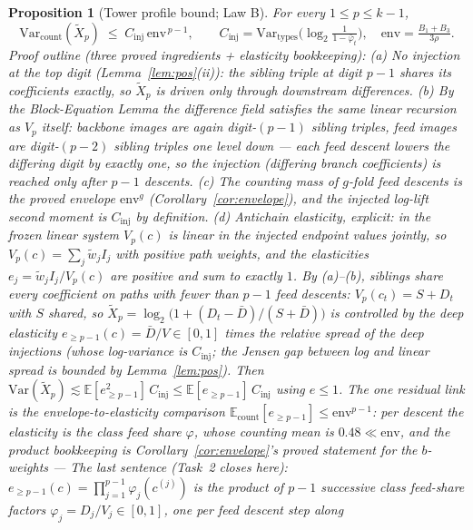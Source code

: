 \documentclass[11pt]{article}
\newtheorem{proposition}[theorem]{Proposition}
\theoremstyle{definition}
\newcommand{\E}{\mathbb{E}}
\newcommand{\Var}{\mathrm{Var}}
\newcommand{\pbar}{\bar\varphi}
\begin{document}
\begin{proposition}[Tower profile bound; Law B]\label{prop:towerB}
For every $1 \le p \le k-1$,
\[
\Var_{\mathrm{count}}(\tilde X_p) \;\le\; C_{\mathrm{inj}}\,
\mathrm{env}^{\,p-1},
\qquad
C_{\mathrm{inj}} = \Var_{\text{types}}\Big(\log_2 \tfrac1{1-\pbar_t}\Big),
\quad \mathrm{env} = \tfrac{B_1+B_3}{3\rho}.
\]
\emph{Proof outline (three proved ingredients + elasticity bookkeeping):}
(a) \emph{No injection at the top digit} (Lemma~\ref{lem:pos}(ii)): the
sibling triple at digit $p{-}1$ shares its coefficients exactly, so
$\tilde X_p$ is driven only through downstream differences. (b) By the
Block-Equation Lemma the difference field satisfies the \emph{same} linear
recursion as $V_p$ itself: backbone images are again digit-$(p{-}1)$
sibling triples, feed images are digit-$(p{-}2)$ sibling triples one level
down --- each feed descent lowers the differing digit by exactly one, so
the injection (differing branch coefficients) is reached only after
$p{-}1$ descents. (c) The counting mass of $g$-fold feed descents is the
proved envelope $\mathrm{env}^{g}$ (Corollary~\ref{cor:envelope}), and the
injected log-lift second moment is $C_{\mathrm{inj}}$ by definition.
(d) \emph{Antichain elasticity, explicit:} in the frozen linear system
$V_p(c)$ is \emph{linear} in the injected endpoint values jointly, so
$V_p(c) = \sum_j \tilde w_j I_j$ with positive path weights, and the
elasticities $e_j = \tilde w_j I_j / V_p(c)$ are positive and sum to
exactly $1$. By (a)--(b), siblings share every coefficient on paths
with fewer than $p{-}1$ feed descents: $V_p(c_t) = S + D_t$ with $S$
shared, so
$\tilde X_p = \log_2\big(1 + (D_t - \bar D)/(S + \bar D)\big)$ is
controlled by the \emph{deep elasticity}
$e_{\ge p-1}(c) = \bar D/V \in [0,1]$ times the relative spread of the
deep injections (whose log-variance is $C_{\mathrm{inj}}$; the Jensen
gap between log and linear spread is bounded by
Lemma~\ref{lem:pos}). Then
$\Var(\tilde X_p) \lesssim \E[e_{\ge p-1}^2]\,C_{\mathrm{inj}}
\le \E[e_{\ge p-1}]\,C_{\mathrm{inj}}$ using $e \le 1$. The one
residual link is the \emph{envelope-to-elasticity comparison}
$\E_{\mathrm{count}}[e_{\ge p-1}] \le \mathrm{env}^{p-1}$: per descent
the elasticity is the class feed share $\varphi$, whose counting mean
is $0.48 \ll \mathrm{env}$, and the product bookkeeping is
Corollary~\ref{cor:envelope}'s proved statement for the $b$-weights ---
The \emph{last sentence} (Task~2 closes here):
$e_{\ge p-1}(c) = \prod_{j=1}^{p-1}\varphi_j(c^{(j)})$
is the product of $p{-}1$ successive class feed-share factors
$\varphi_j = D_j/V_j \in [0,1]$, one per feed descent step along

\end{proposition}
\end{document}
